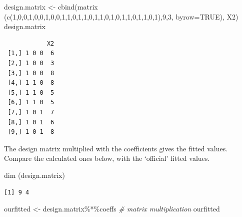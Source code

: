 \documentclass[
  oneside]{krantz}
\newenvironment{Shaded}{\begin{snugshade}}{\end{snugshade}}
\newcommand{\AttributeTok}[1]{\textcolor[rgb]{0.77,0.63,0.00}{#1}}
\newcommand{\CommentTok}[1]{\textcolor[rgb]{0.56,0.35,0.01}{\textit{#1}}}
\newcommand{\ConstantTok}[1]{\textcolor[rgb]{0.00,0.00,0.00}{#1}}
\newcommand{\DecValTok}[1]{\textcolor[rgb]{0.00,0.00,0.81}{#1}}
\newcommand{\FunctionTok}[1]{\textcolor[rgb]{0.00,0.00,0.00}{#1}}
\newcommand{\NormalTok}[1]{#1}
\newcommand{\OtherTok}[1]{\textcolor[rgb]{0.56,0.35,0.01}{#1}}
\newcommand{\SpecialCharTok}[1]{\textcolor[rgb]{0.00,0.00,0.00}{#1}}
\begin{document}
\begin{Shaded}
\begin{Highlighting}[]
\NormalTok{design.matrix }\OtherTok{\textless{}{-}} \FunctionTok{cbind}\NormalTok{(}\FunctionTok{matrix}\NormalTok{ (}\FunctionTok{c}\NormalTok{(}\DecValTok{1}\NormalTok{,}\DecValTok{0}\NormalTok{,}\DecValTok{0}\NormalTok{,}\DecValTok{1}\NormalTok{,}\DecValTok{0}\NormalTok{,}\DecValTok{0}\NormalTok{,}\DecValTok{1}\NormalTok{,}\DecValTok{0}\NormalTok{,}\DecValTok{0}\NormalTok{,}\DecValTok{1}\NormalTok{,}\DecValTok{1}\NormalTok{,}\DecValTok{0}\NormalTok{,}\DecValTok{1}\NormalTok{,}\DecValTok{1}\NormalTok{,}\DecValTok{0}\NormalTok{,}\DecValTok{1}\NormalTok{,}\DecValTok{1}\NormalTok{,}\DecValTok{0}\NormalTok{,}\DecValTok{1}\NormalTok{,}\DecValTok{0}\NormalTok{,}\DecValTok{1}\NormalTok{,}\DecValTok{1}\NormalTok{,}\DecValTok{0}\NormalTok{,}\DecValTok{1}\NormalTok{,}\DecValTok{1}\NormalTok{,}\DecValTok{0}\NormalTok{,}\DecValTok{1}\NormalTok{),}\DecValTok{9}\NormalTok{,}\DecValTok{3}\NormalTok{, }
                               \AttributeTok{byrow=}\ConstantTok{TRUE}\NormalTok{), X2)}
\NormalTok{design.matrix}
\end{Highlighting}
\end{Shaded}

\begin{verbatim}
            X2
 [1,] 1 0 0  6
 [2,] 1 0 0  3
 [3,] 1 0 0  8
 [4,] 1 1 0  8
 [5,] 1 1 0  5
 [6,] 1 1 0  5
 [7,] 1 0 1  7
 [8,] 1 0 1  6
 [9,] 1 0 1  8
\end{verbatim}

The design matrix multiplied with the coefficients gives the fitted values. Compare the calculated ones below, with the `official' fitted values.

\begin{Shaded}
\begin{Highlighting}[]
\FunctionTok{dim}\NormalTok{ (design.matrix)}
\end{Highlighting}
\end{Shaded}

\begin{verbatim}
[1] 9 4
\end{verbatim}

\begin{Shaded}
\begin{Highlighting}[]
\NormalTok{ourfitted }\OtherTok{\textless{}{-}}\NormalTok{ design.matrix}\SpecialCharTok{\%*\%}\NormalTok{coeffs }\CommentTok{\# matrix multiplication}
\NormalTok{ourfitted}
\end{Highlighting}
\end{Shaded}
\end{document}
